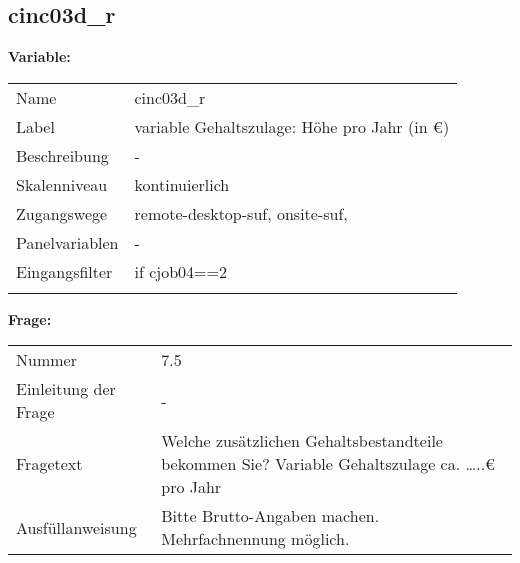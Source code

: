 	
	
	\subsection{cinc03d\_r}
	\label{subSection:cinc03d_r}

	\noindent\textbf{Variable:}\\
		\begin{tabular}{lL{11.3cm}}
			\label{tableVariable:cinc03d_r}
			Name & cinc03d\_r \\
			Label & variable Gehaltszulage: Höhe pro Jahr (in €) \\
			Beschreibung & - \\
			Skalenniveau & kontinuierlich \\
			Zugangswege &
				remote-desktop-suf,
				onsite-suf,
 \\
			Panelvariablen & -
			 \\
			Eingangsfilter & if cjob04==2 \\
 \\
		\end{tabular}

		\vspace*{1 cm}
		\noindent\textbf{Frage:}\\
		\begin{tabular}{lL{11.3cm}}
			\label{tableQuestion:cinc03d_r}
			Nummer & 7.5 \\
			Einleitung der Frage & - \\
			Fragetext & Welche zusätzlichen Gehaltsbestandteile bekommen Sie?
Variable Gehaltszulage
ca. …..€ pro Jahr \\
			Ausfüllanweisung & 
Bitte Brutto-Angaben machen. Mehrfachnennung möglich. \\
		\end{tabular}




